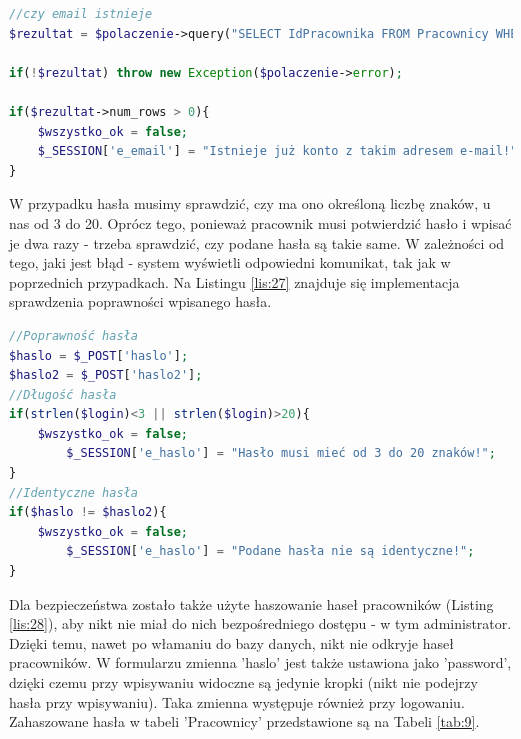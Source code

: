 \documentclass[eng,printmode,openany,oneside]{mgr}
\begin{document}
	
\begin{lstlisting}[caption={Implementacja sprawdzenia czy e-mail istnieje w bazie danych}, language=PHP]
//czy email istnieje
$rezultat = $polaczenie->query("SELECT IdPracownika FROM Pracownicy WHERE Email='$email'");

if(!$rezultat) throw new Exception($polaczenie->error);

if($rezultat->num_rows > 0){
	$wszystko_ok = false;
	$_SESSION['e_email'] = "Istnieje już konto z takim adresem e-mail!";
}
\end{lstlisting}
	

	
	

	
		
	
	
	





	
W przypadku hasła musimy sprawdzić, czy ma ono określoną liczbę znaków, u nas od 3 do 20. Oprócz tego, ponieważ pracownik musi potwierdzić hasło i wpisać je dwa razy - trzeba sprawdzić, czy podane hasła są takie same. W zależności od tego, jaki jest błąd - system wyświetli odpowiedni komunikat, tak jak w poprzednich przypadkach. Na Listingu \ref{lis:27} znajduje się implementacja sprawdzenia poprawności wpisanego hasła.
	
	
	
	
\begin{lstlisting}[caption={Implementacja sprawdzenia poprawności hasła}, language=PHP, label={lis:27}]
//Poprawność hasła
$haslo = $_POST['haslo'];
$haslo2 = $_POST['haslo2'];
//Długość hasła
if(strlen($login)<3 || strlen($login)>20){
	$wszystko_ok = false;
      	$_SESSION['e_haslo'] = "Hasło musi mieć od 3 do 20 znaków!";
}
//Identyczne hasła
if($haslo != $haslo2){
	$wszystko_ok = false;
      	$_SESSION['e_haslo'] = "Podane hasła nie są identyczne!";
}
\end{lstlisting}	
	
	
	
Dla bezpieczeństwa zostało także użyte haszowanie haseł pracowników (Listing \ref{lis:28}), aby nikt nie miał do nich bezpośredniego dostępu - w tym administrator. Dzięki temu, nawet po włamaniu do bazy danych, nikt nie odkryje haseł pracowników. W formularzu zmienna 'haslo' jest także ustawiona jako 'password', dzięki czemu przy wpisywaniu widoczne są jedynie kropki (nikt nie podejrzy hasła przy wpisywaniu). Taka zmienna występuje również przy logowaniu. Zahaszowane hasła w tabeli 'Pracownicy' przedstawione są na Tabeli \ref{tab:9}.
	
\end{document}

